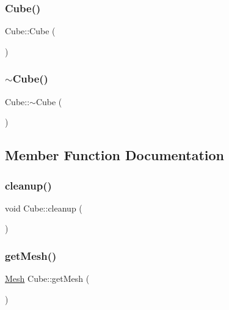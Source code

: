 \subsubsection{\texorpdfstring{Cube()}{Cube()}\hspace{0.1cm}{\footnotesize\ttfamily [3/3]}}
{\footnotesize\ttfamily Cube\+::\+Cube (\begin{DoxyParamCaption}{ }\end{DoxyParamCaption})}

\mbox{\label{classCube_aa814e979cecb8c451fdb332ded2cea1e}} 
\subsubsection{\texorpdfstring{$\sim$\+Cube()}{~Cube()}}
{\footnotesize\ttfamily Cube\+::$\sim$\+Cube (\begin{DoxyParamCaption}{ }\end{DoxyParamCaption})}



\subsection{Member Function Documentation}
\mbox{\label{classCube_aacf58e77463b0a26b81c141aa036af08}} 
\subsubsection{\texorpdfstring{cleanup()}{cleanup()}}
{\footnotesize\ttfamily void Cube\+::cleanup (\begin{DoxyParamCaption}{ }\end{DoxyParamCaption})\hspace{0.3cm}{\ttfamily [static]}}

\mbox{\label{classCube_a16590bea0a2e21a9a068d9f17a5f9c59}} 
\subsubsection{\texorpdfstring{get\+Mesh()}{getMesh()}}
{\footnotesize\ttfamily \mbox{\hyperlink{structMesh}{Mesh}} Cube\+::get\+Mesh (\begin{DoxyParamCaption}{ }\end{DoxyParamCaption})}

